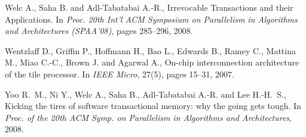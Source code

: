 \begin{thebibliography}{99}
{%
Welc A., Saha B. and Adl-Tabatabai A.-R., 
Irrevocable Transactions and their Applications. 
In {\it  Proc. 20th  Int'l  ACM Symposium on Parallelism in Algorithms 
and Architectures   (SPAA'08)},  pages 285--296,  2008. 


Wentzlaff D., Griffin P., Hoffmann H., Bao L., Edwards B., Ramey C.,
  Mattina M., Miao C.-C., Brown J. and Agarwal A.,
\newblock On-chip interconnection architecture of the tile processor.
\newblock In {\em IEEE Micro}, 27(5), pages 15--31, 2007.


Yoo R.~M., Ni Y., Welc A., Saha B., Adl-Tabatabai A.-R. and
  Lee H.-H.~S.,
\newblock Kicking the tires of software transactional memory: why the going
  gets tough.
\newblock In {\em Proc. of the 20th ACM Symp. on Parallelism in Algorithms and
  Architectures}, 2008.





}
\end{thebibliography}
